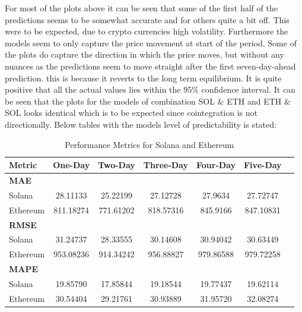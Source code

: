 \noindent For most of the plots above it can be seen that some of the first half of the predictions seems to be somewhat accurate and for others quite a bit off. This were to be expected, due to crypto currencies high volatility. Furthermore the models seem to only capture the price movement at start of the period. Some of the plots do capture the direction in which the price moves, but without any nuances as the predictions seem to move straight after the first seven-day-ahead prediction. this is because it reverts to the long term equilibrium. It is quite positive that all the actual values lies within the $95\%$ confidence interval. It can be seen that the plots for the models of combination SOL \& ETH and ETH \& SOL looks identical which is to be expected since cointegration is not directionally. Below tables with the models level of predictability is stated:

\begin{table}[H]
\centering
\caption{Performance Metrics for Solana and Ethereum}
\begin{tabular}{lcccccc}
\toprule
\textbf{Metric} & \textbf{One-Day} & \textbf{Two-Day} & \textbf{Three-Day} & \textbf{Four-Day} & \textbf{Five-Day} \\
\midrule
\textbf{MAE} & & & & & \\
Solana        & 28.11133 & 25.22199 & 27.12728 & 27.9634 & 27.72747 \\
Ethereum      & 811.18274 & 771.61202 & 818.57316 & 845.9166 & 847.10831 \\
\midrule
\textbf{RMSE} & & & & & \\
Solana        & 31.24737 & 28.33555 & 30.14608 & 30.94042 & 30.63449 \\
Ethereum      & 953.08236 & 914.34242 & 956.88827 & 979.86588 & 979.72258 \\
\midrule
\textbf{MAPE} & & & & & \\
Solana        & 19.85790 & 17.85844 & 19.18544 & 19.77437 & 19.62114 \\
Ethereum      & 30.54404 & 29.21761 & 30.93889 & 31.95720 & 32.08274 \\
\bottomrule
\end{tabular}
\end{table}

